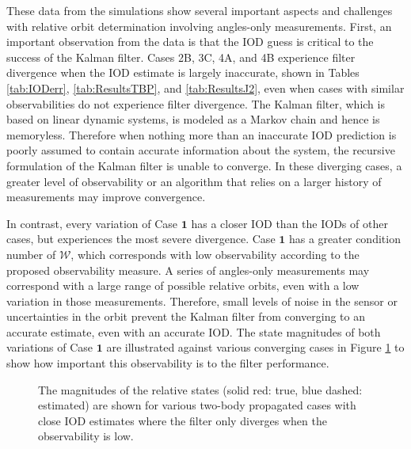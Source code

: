 \documentclass[letterpaper, paper,10pt]{AAS}		%
\begin{document}
These data from the simulations show several important aspects and challenges with relative orbit determination involving angles-only measurements.
First, an important observation from the data is that the IOD guess is critical to the success of the Kalman filter.
Cases 2B, 3C, 4A, and 4B experience filter divergence when the IOD estimate is largely inaccurate, shown in Tables \ref{tab:IODerr}, \ref{tab:ResultsTBP}, and \ref{tab:ResultsJ2}, even when cases with similar observabilities do not experience filter divergence.
The Kalman filter, which is based on linear dynamic systems, is modeled as a Markov chain and hence is memoryless.
Therefore when nothing more than an inaccurate IOD prediction is poorly assumed to contain accurate information about the system, the recursive formulation of the Kalman filter is unable to converge.
In these diverging cases, a greater level of observability or an algorithm that relies on a larger history of measurements may improve convergence.


In contrast, every variation of Case $\mathbf{1}$ has a closer IOD than the IODs of other cases, but experiences the most severe divergence.
Case $\mathbf{1}$ has a greater condition number of $\mathcal W$, which corresponds with low observability according to the proposed observability measure.
A series of angles-only measurements may correspond with a large range of possible relative orbits, even with a low variation in those measurements.
Therefore, small levels of noise in the sensor or uncertainties in the orbit prevent the Kalman filter from converging to an accurate estimate, even with an accurate IOD.
The state magnitudes of both variations of Case $\mathbf{1}$ are illustrated against various converging cases in Figure \ref{fig:ExampesEachCase} to show how important this observability is to the filter performance.

\begin{figure}[h]
\centerline{
	\hfill
}
\centerline{
	\hfill
}
\centerline{
	\hfill
}
\centerline{
	\hfill
}
\centerline{
	\hfill
}
\caption{The magnitudes of the relative states (solid red: true, blue dashed: estimated) are shown for various two-body propagated cases with close IOD estimates where the filter only diverges when the observability is low.}\label{fig:ExampesEachCase}
\end{figure}
\end{document}

